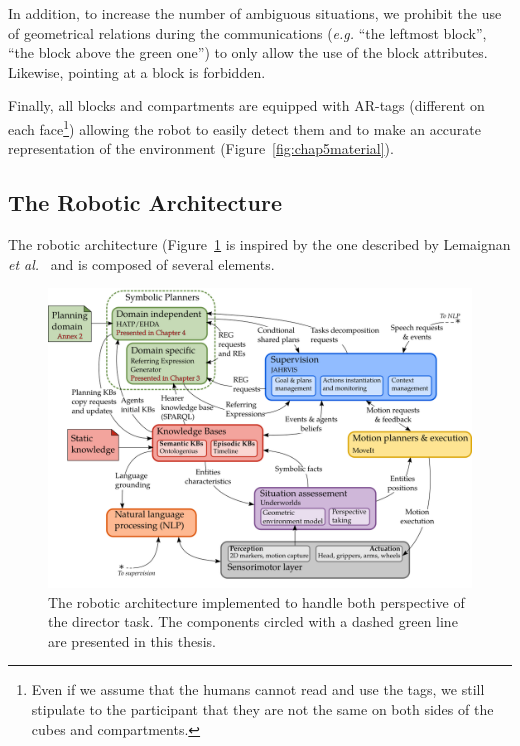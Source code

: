 \documentclass[a4paper,11pt,twoside]{StyleThese}
\begin{document}
In addition, to increase the number of ambiguous situations, we prohibit the use of geometrical relations during the communications (\textit{e.g.} ``the leftmost block'', ``the block above the green one'') to only allow the use of the block attributes. Likewise, pointing at a block is forbidden.

Finally, all blocks and compartments are equipped with AR-tags (different on each face\footnote{Even if we assume that the humans cannot read and use the tags, we still stipulate to the participant that they are not the same on both sides of the cubes and compartments.}) allowing the robot to easily detect them and to make an accurate representation of the environment (Figure~\ref{fig:chap5material}).

\subsection{The Robotic Architecture}
The robotic architecture (Figure~\ref{fig:chap5dtarchi} is inspired by the one described by Lemaignan \textit{et al.}~\cite{lemaignan2017artificial} and is composed of several elements.

\begin{figure}[hbtp]
\centering
\includegraphics[width=\textwidth]{figures/chapter5/architecture.png}
\caption{The robotic architecture implemented to handle both perspective of the director task. The components circled with a dashed green line are presented in this thesis.}
\label{fig:chap5dtarchi}
\end{figure}
\end{document}
